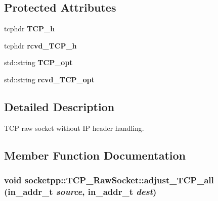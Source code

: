 \subsection*{Protected Attributes}
\begin{CompactItemize}
\item 
\hypertarget{classsocketpp_1_1TCP__RawSocket_d1980411bd147dd67f6d9d9578414c17}{
tcphdr \textbf{TCP\_\-h}}
\label{classsocketpp_1_1TCP__RawSocket_d1980411bd147dd67f6d9d9578414c17}

\item 
\hypertarget{classsocketpp_1_1TCP__RawSocket_12b2d2f00d02c377301fc10e1209a8b8}{
tcphdr \textbf{rcvd\_\-TCP\_\-h}}
\label{classsocketpp_1_1TCP__RawSocket_12b2d2f00d02c377301fc10e1209a8b8}

\item 
\hypertarget{classsocketpp_1_1TCP__RawSocket_380529364d9488faf998543d433d8fe6}{
std::string \textbf{TCP\_\-opt}}
\label{classsocketpp_1_1TCP__RawSocket_380529364d9488faf998543d433d8fe6}

\item 
\hypertarget{classsocketpp_1_1TCP__RawSocket_b7bddcb31a7a310bcf61fcc474ded465}{
std::string \textbf{rcvd\_\-TCP\_\-opt}}
\label{classsocketpp_1_1TCP__RawSocket_b7bddcb31a7a310bcf61fcc474ded465}

\end{CompactItemize}


\subsection{Detailed Description}
TCP raw socket without IP header handling. 

\subsection{Member Function Documentation}
\hypertarget{classsocketpp_1_1TCP__RawSocket_0a1017145ae76253dfca51cbd672fae7}{
\subsubsection[{adjust\_\-TCP\_\-all}]{\setlength{\rightskip}{0pt plus 5cm}void socketpp::TCP\_\-RawSocket::adjust\_\-TCP\_\-all (in\_\-addr\_\-t {\em source}, \/  in\_\-addr\_\-t {\em dest})}}
\label{classsocketpp_1_1TCP__RawSocket_0a1017145ae76253dfca51cbd672fae7}


